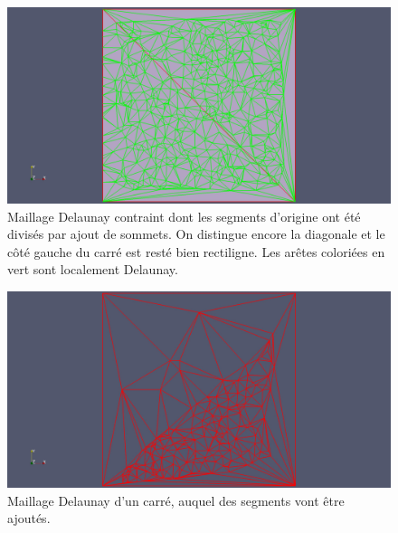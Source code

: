 \documentclass[12pt,a4paper]{report}
\begin{document}
\begin{figure}[t]
\begin{center}
\includegraphics[scale=0.35, viewport=530 0 1680 1129, clip]{cutSegments.jpg}
\caption{Maillage Delaunay contraint dont les segments d'origine ont été divisés par ajout de sommets. On distingue encore la diagonale et le côté gauche du carré est resté bien rectiligne. Les arêtes coloriées en vert sont localement Delaunay.}\label{cut_segments}
\end{center}
\end{figure}

\begin{figure}[t]
\begin{center}
\includegraphics[scale=0.35, viewport=500 0 1680 1129, clip]{simpleDelaunay.jpg}
\caption{Maillage Delaunay d'un carré, auquel des segments vont être ajoutés.}\label{simple_Delaunay}
\end{center}
\end{figure}
\end{document}
